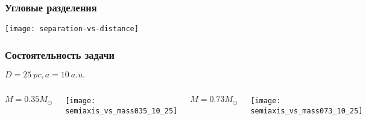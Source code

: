 \begin{frame}
\frametitle{Угловые разделения}
\begin{center}
\texttt{[image: separation-vs-distance]}
\end{center}
\end{frame}


\begin{frame}%
\frametitle{Состоятельность задачи}
\begin{center}
{\footnotesize $D=25~pc, a=10~a.u.$}
\end{center}
\begin{columns}
	\begin{center}
	{\footnotesize $M = 0.35M_\odot$}
	\end{center}
	\texttt{[image: semiaxis\_vs\_mass035\_10\_25]}
\begin{center}
	{\footnotesize $M = 0.73M_\odot$}
	\end{center}
	\texttt{[image: semiaxis\_vs\_mass073\_10\_25]}
\end{columns}
\\
\end{frame}

